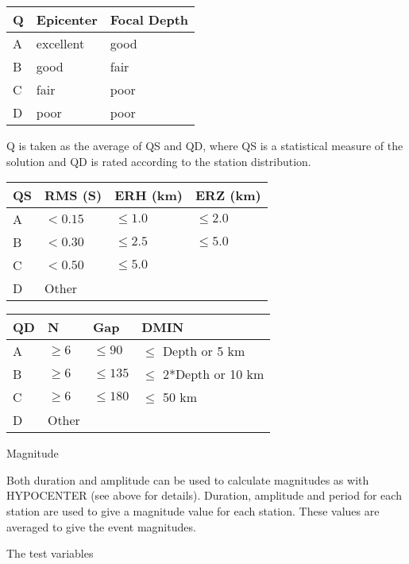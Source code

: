 \begin{tabular}{|lll|}
\hline
Q & Epicenter & Focal Depth \\
\hline
A & excellent & good \\
B & good & fair \\
C & fair & poor \\
D & poor & poor\\
\hline
\end{tabular}

Q is taken as the average of QS and QD, where QS is a statistical measure of the solution and QD is rated according to the station distribution. 

\begin{tabular}{|llll|}
\hline
QS & RMS (S) & ERH (km) & ERZ (km) \\
\hline
A & $< 0.15$ & $\le 1.0 $ & $\le 2.0$ \\
B & $< 0.30$ & $\le 2.5 $ & $\le 5.0$ \\
C & $< 0.50$ & $\le 5.0$ & \\
D & Other    & & \\
\hline
\end{tabular}

\begin{tabular}{|llll|}
\hline
QD & N & Gap & DMIN \\
\hline
A  & $\ge 6$  & $\le 90$  & $\le$ Depth or 5 km \\
B  & $\ge 6$  & $\le 135$  & $\le$ 2*Depth or 10 km \\
C  & $\ge 6$  & $\le 180$  & $\le$ 50 km  \\
D   & Other   &     & \\
\hline
\end{tabular}

Magnitude  

Both duration and amplitude can be used to calculate magnitudes as with HYPOCENTER (see above for details). Duration, amplitude and period for each station are used to give a magnitude value for each station. These values are averaged to give the event magnitudes. 


The test variables

